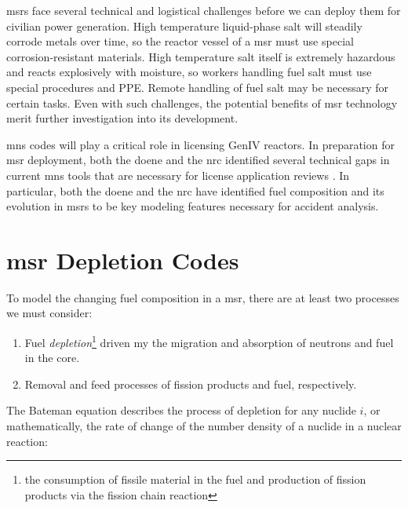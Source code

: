 \Gls{msr}s face several technical and logistical challenges before we can
deploy them for civilian power generation. High temperature liquid-phase salt
will steadily corrode metals over time, so the reactor vessel of a \Gls{msr}
must use special corrosion-resistant materials. High temperature salt itself is
extremely hazardous and reacts explosively with moisture, so workers handling
fuel salt must use special procedures and PPE. Remote handling of fuel salt may
be necessary for certain tasks. Even with such challenges, the 
potential benefits of \Gls{msr} technology merit further investigation
into its development.

\Gls{mns} codes will play a critical role in licensing GenIV reactors. In
preparation for \Gls{msr} deployment, both the \Gls{doene} and the \Gls{nrc}
identified several technical gaps in current \Gls{mns} tools that are necessary
for license application reviews
\cite{betzler_modeling_2019} \cite{usnrc_nonlwr_2020-1}. In particular, both the
\Gls{doene} and the \Gls{nrc} have identified fuel composition and its
evolution in \Gls{msr}s to be key modeling features necessary for accident
analysis. 

\section{\Gls{msr} Depletion Codes}%
\label{sec:msr_codes}

To model the changing fuel composition in a \Gls{msr}, there are at least two
processes we must consider:
\begin{enumerate}
    \item Fuel {\it depletion}\footnote{the consumption of fissile material in the fuel and production of fission products via the fission chain reaction} driven my the migration and absorption of neutrons and fuel in the core.
    \item Removal and feed processes of fission products and fuel, respectively.
\end{enumerate}

The Bateman equation describes the process of depletion for any nuclide $i$, or
mathematically, the rate of change of the number density of a nuclide in a nuclear reaction:

